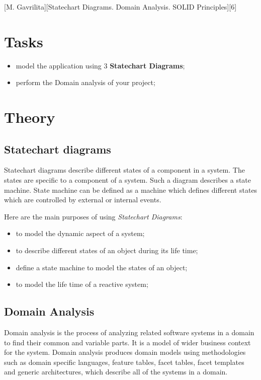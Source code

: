 \documentclass{article}
\begin{document}
	[M. Gavrilita][Statechart Diagrams. Domain Analysis. SOLID Principles][6]

	\section{Tasks}
		\begin{itemize}
			\item model the application using 3 \textbf{Statechart Diagrams};
			\item perform the Domain analysis of your project;
		\end{itemize}

	\section{Theory}
		\subsection{Statechart diagrams}
			Statechart diagrams describe different states of a component in a system. The states are specific to a component of a system. Such a diagram describes a state machine. State machine can be defined as a machine which defines different states which are controlled by external or internal events.

			\bigskip
			Here are the main purposes of using \textit{Statechart Diagrams}:
			\begin{itemize}
				\item to model the dynamic aspect of a system;
				\item to describe different states of an object during its life time;
				\item define a state machine to model the states of an object;
				\item to model the life time of a reactive system;
			\end{itemize}

		\subsection{Domain Analysis}
			Domain analysis is the process of analyzing related software systems in a domain to find their common and variable parts. It is a model of wider business context for the system. Domain analysis produces domain models using methodologies such as domain specific languages, feature tables, facet tables, facet templates and generic architectures, which describe all of the systems in a domain.
\end{document}
